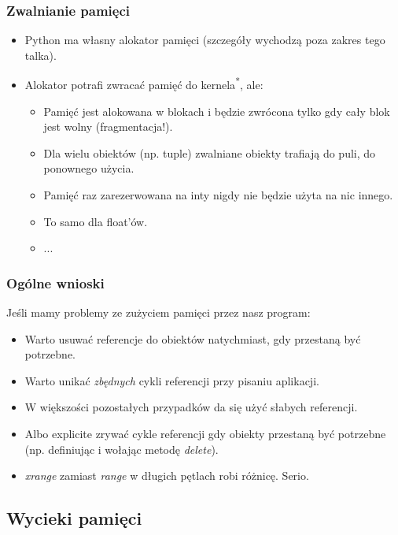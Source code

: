 \documentclass{beamer}
\begin{document}
    \begin{frame}
        \frametitle{Zwalnianie pamięci}
        \begin{itemize}
            \item Python ma własny alokator pamięci (szczegóły wychodzą poza zakres tego talka).
            \item Alokator potrafi zwracać pamięć do kernela\textsuperscript{*}, ale:
            \begin{itemize}
                \item Pamięć jest alokowana w blokach i będzie zwrócona tylko gdy cały blok jest wolny (fragmentacja!).
                \item Dla wielu obiektów (np. tuple) zwalniane obiekty trafiają do puli, do ponownego użycia.
                \item Pamięć raz zarezerwowana na inty nigdy nie będzie użyta na nic innego.
                \item To samo dla float'ów.
                \item ...
            \end{itemize}
        \end{itemize}
    \end{frame}

    \begin{frame}
        \frametitle{Ogólne wnioski}
        Jeśli mamy problemy ze zużyciem pamięci przez nasz program:
        \begin{itemize}
            \item Warto usuwać referencje do obiektów natychmiast, gdy przestaną być potrzebne.
            \item Warto unikać \textit{zbędnych} cykli referencji przy pisaniu aplikacji.
            \item W większości pozostałych przypadków da się użyć słabych referencji.
            \item Albo explicite zrywać cykle referencji gdy obiekty przestaną być potrzebne (np. definiując i wołając metodę \textit{delete}).
            \item \textit{xrange} zamiast \textit{range} w długich pętlach robi różnicę. Serio.
        \end{itemize}
    \end{frame}

\subsection{Wycieki pamięci}
\frame\subsectionpage
\end{document}
